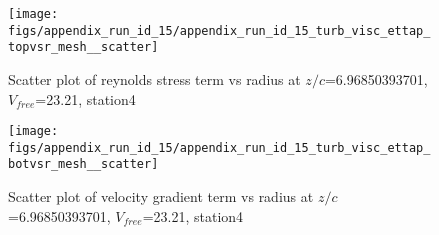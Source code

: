 \begin{figure}[H]
\centering
\texttt{[image: figs/appendix\_run\_id\_15/appendix\_run\_id\_15\_turb\_visc\_ettap\_topvsr\_mesh\_\_scatter]}
\caption{Scatter plot of reynolds stress term vs radius at $z/c$=6.96850393701, $V_{free}$=23.21, station4}
\label{fig:appendix_run_id_15_turb_visc_ettap_topvsr_mesh__scatter}
\end{figure}


\begin{figure}[H]
\centering
\texttt{[image: figs/appendix\_run\_id\_15/appendix\_run\_id\_15\_turb\_visc\_ettap\_botvsr\_mesh\_\_scatter]}
\caption{Scatter plot of velocity gradient term vs radius at $z/c$=6.96850393701, $V_{free}$=23.21, station4}
\label{fig:appendix_run_id_15_turb_visc_ettap_botvsr_mesh__scatter}
\end{figure}


